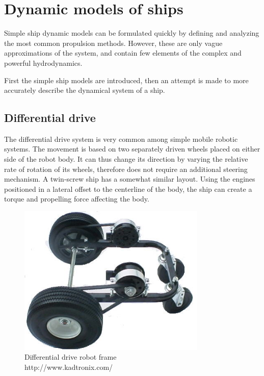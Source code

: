 \section{Dynamic models of ships}

Simple ship dynamic models can be formulated quickly by defining and analyzing the most common propulsion methods. However, these are only vague approximations of the system, and contain few elements of the complex and powerful hydrodynamics.

First the simple ship models are introduced, then an attempt is made to more accurately describe the dynamical system of a ship.

\subsection{Differential drive}

The differential drive system is very common among simple mobile robotic systems. The movement is based on two separately driven wheels placed on either side of the robot body. It can thus change its direction by varying the relative rate of rotation of its wheels, therefore does not require an additional steering mechanism. A twin-screw ship has a somewhat similar layout. Using the engines positioned in a lateral offset to the centerline of the body, the ship can create a torque and propelling force affecting the body.

\begin{figure}[H]
	\centering
	\includegraphics[width=0.8\textwidth]{pics/kadtronixframe}
	\caption{Differential drive robot frame \\ http://www.kadtronix.com/}
	\label{fig:kadtronixframe}
\end{figure}

